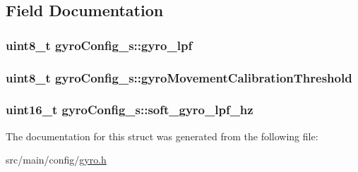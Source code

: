 \subsection{Field Documentation}
\hypertarget{structgyroConfig__s_a8f8ef114a23690030f125c9506ed1f84}{
\subsubsection[{gyro\+\_\+lpf}]{\setlength{\rightskip}{0pt plus 5cm}uint8\+\_\+t gyro\+Config\+\_\+s\+::gyro\+\_\+lpf}}\label{structgyroConfig__s_a8f8ef114a23690030f125c9506ed1f84}
\hypertarget{structgyroConfig__s_ae1ba510cef0d2b28b17f457bfc8b0e70}{
\subsubsection[{gyro\+Movement\+Calibration\+Threshold}]{\setlength{\rightskip}{0pt plus 5cm}uint8\+\_\+t gyro\+Config\+\_\+s\+::gyro\+Movement\+Calibration\+Threshold}}\label{structgyroConfig__s_ae1ba510cef0d2b28b17f457bfc8b0e70}
\hypertarget{structgyroConfig__s_a79715d5804095aa37049450ad732a7ee}{
\subsubsection[{soft\+\_\+gyro\+\_\+lpf\+\_\+hz}]{\setlength{\rightskip}{0pt plus 5cm}uint16\+\_\+t gyro\+Config\+\_\+s\+::soft\+\_\+gyro\+\_\+lpf\+\_\+hz}}\label{structgyroConfig__s_a79715d5804095aa37049450ad732a7ee}


The documentation for this struct was generated from the following file\+:\begin{DoxyCompactItemize}
\item 
src/main/config/\hyperlink{config_2gyro_8h}{gyro.\+h}\end{DoxyCompactItemize}
